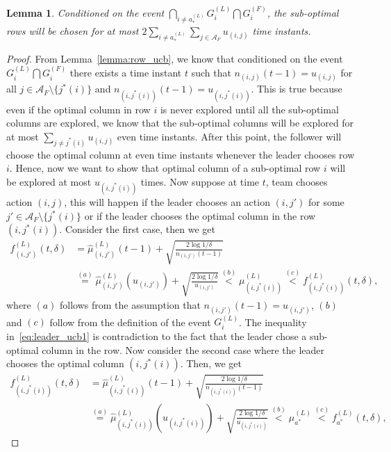 \documentclass[letterpaper]{article} %
\newtheorem{lemma}{Lemma}
\theoremstyle{definition}
\def\mc{\mathcal}
\begin{document}
\begin{lemma}
\label{lemma:leader_ucb}
Conditioned on the event $\bigcap_{i \neq a^{(L)}_{\ast}} G^{(L)}_i \bigcap G^{(F)}_i$, the sub-optimal rows will be chosen for at most $2\sum_{i \neq a^{(L)}_{\ast}} \sum_{j \in \mc{A}_F} u_{(i,j)}$ time instants.
\end{lemma}
\begin{proof}
From Lemma~\ref{lemma:row_ucb}, we know that conditioned on the event $G^{(L)}_i \bigcap G^{(F)}_i$ there exists a time instant $t$ such that $n_{(i,j)}(t-1) = u_{(i,j)}$ for all $j \in \mc{A}_F\setminus \{j^{\ast}(i)\}$ and $n_{(i, j^{\ast}(i))}(t-1) = u_{(i, j^{\ast}(i))}$. This is true because even if the optimal column in row $i$ is never explored until all the sub-optimal columns are explored, we know that the sub-optimal columns will be explored for at most $\sum_{j \neq j^{\ast}(i)} u_{(i,j)}$ even time instants. After this point, the follower will choose the optimal column at even time instants whenever the leader chooses row $i$. Hence, now we want to show that optimal column of a sub-optimal row $i$ will be explored at most $u_{(i, j^{\ast}(i))}$ times. Now suppose at time $t$, team chooses action $(i,j)$, this will happen if the leader chooses an action $(i,j')$ for some $j' \in \mc{A}_F\setminus \{j^{\ast}(i)\}$ or if the leader chooses the optimal column in the row $(i, j^{\ast}(i))$. Consider the first case, then we get
\begin{align}
    f^{(L)}_{(i, j')}(t, \delta)
    & = \hat{\mu}^{(L)}_{(i, j')}(t-1) + \sqrt{\frac{2\log 1/\delta}{n_{(i, j')}(t-1)}}
    \\
    & \overset{(a)}= \hat{\mu}^{(L)}_{(i, j')}(u_{(i, j')}) + \sqrt{ \frac{2\log 1/\delta}{u_{(i, j')}}} \overset{(b)} < \mu^{(L)}_{(i,j^{\ast}(i))} \overset{(c)} < f^{(L)}_{(i,j^{\ast}(i))}(t,\delta),
    \label{eq:leader_ucb1}
\end{align}
where $(a)$ follows from the assumption that $n_{(i, j')}(t-1) = u_{(i, j')}$, $(b)$ and $(c)$ follow from the definition of the event $G^{(L)}_{i}$. The inequality in~\eqref{eq:leader_ucb1} is contradiction to the fact that the leader chose a sub-optimal column in the row. Now consider the second case where the leader chooses the optimal column $(i, j^{\ast}(i))$. Then, we get
\begin{align}
    f^{(L)}_{(i, j^{\ast}(i))}(t, \delta)
    & = \hat{\mu}^{(L)}_{(i, j^{\ast}(i))}(t-1) + \sqrt{\frac{2\log 1/\delta}{n_{(i,j^{\ast}(i))}(t-1)}}
    \\
    & \overset{(a)}= \hat{\mu}^{(L)}_{(i, j^{\ast}(i))}(u_{(i, j^{\ast}(i))}) + \sqrt{ \frac{2\log 1/\delta}{u_{(i, j^{\ast}(i))}}} \overset{(b)} < \mu^{(L)}_{a^{\ast}} \overset{(c)} < f^{(L)}_{a^{\ast}}(t,\delta),

\end{align}
\end{proof}
\end{document}
